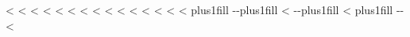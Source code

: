 \begin{savenotes}
\sphinxatlongtablestart
\sphinxthistablewithglobalstyle
<%
\sphinxthistablewithbooktabsstyle
<%
<%
\sphinxthistablewithborderlessstyle
<%
<%
\sphinxthistablewithstandardstyle
<%
<%
\sphinxthistablewithvlinesstyle
<%
<%
\sphinxthistablewithnovlinesstyle
<%
<%
\sphinxthistablewithcolorrowsstyle
<%
<%
\sphinxthistablewithnocolorrowsstyle
<%
\makeatletter
<%
  \LTleft \@totalleftmargin plus1fill
  \LTright\dimexpr\columnwidth-\@totalleftmargin-\linewidth\relax plus1fill
<%
  \LTleft \@totalleftmargin
  \LTright\dimexpr\columnwidth-\@totalleftmargin-\linewidth\relax plus1fill
<%
  \LTleft \@totalleftmargin plus1fill
  \LTright\dimexpr\columnwidth-\@totalleftmargin-\linewidth\relax
<%
\makeatother
{}
\sphinxtableafterendhook
\sphinxatlongtableend
\end{savenotes}